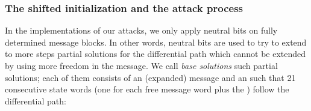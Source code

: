 %
%
%
%

\subsubsection{The shifted initialization and the attack process}
\label{sec:free_att}

In the implementations of our attacks, we only apply neutral bits on fully determined message blocks. In other words, neutral bits are used to try to extend to more steps
partial solutions for the differential path which cannot be extended by using more freedom in the message.
We call \emph{base solutions} such partial solutions; each of them consists of an (expanded) message and an \iv
such that 21 consecutive state words (one for each free message word plus the \iv) follow the differential path:

